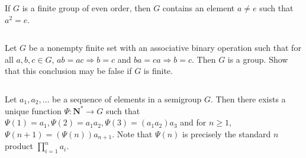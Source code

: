 \begin{ex}
    If $G$ is a finite group of even order, then $G$ contains an element $a\neq e$ such that $a^{2}=e$.
\end{ex}

$$ $$

\begin{ex}
    Let $G$ be a nonempty finite set with an associative binary operation such that for all $a, b, c\in G$, $ab = ac\Rightarrow b = c$ and $ba  =ca \Rightarrow b = c$. Then $G$ is a group. Show that this conclusion may be false if $G$ is finite.
\end{ex}

$$ $$

\begin{ex}
    Let $a_1, a_2,\dots$ be a sequence of elements in a semigroup $G$. Then there exists a unique function $\Psi: \mathbf{N^*}\rightarrow G$ such that $\Psi(1)=a_1, \Psi(2)=a_1a_2, \Psi(3)=(a_1a_2)a_3$ and for $n\geq 1$, $\Psi(n+1)=(\Psi(n))a_{n+1}$. Note that $\Psi(n)$ is precisely the standard $n$ product $\prod_{i=1}^na_i$.
\end{ex}